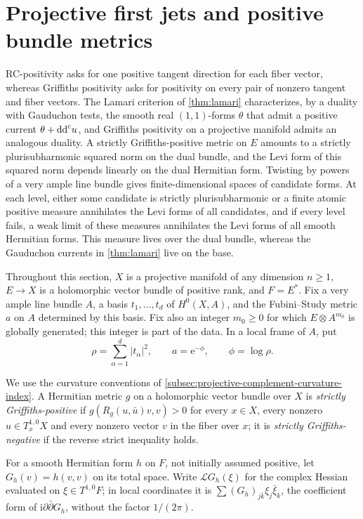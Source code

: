 \section{Projective first jets and positive bundle metrics}
\label{sec:projective-first-jet-positivity}

RC-positivity asks for one positive tangent direction for each fiber vector, whereas Griffiths positivity asks for positivity on every pair of nonzero tangent and fiber vectors. The Lamari criterion of \cref{thm:lamari} characterizes, by a duality with Gauduchon tests, the smooth real $(1,1)$-forms $\theta$ that admit a positive current $\theta+\mathrm{dd}^{\mathrm{c}} u$, and Griffiths positivity on a projective manifold admits an analogous duality. A strictly Griffiths-positive metric on $E$ amounts to a strictly plurisubharmonic squared norm on the dual bundle, and the Levi form of this squared norm depends linearly on the dual Hermitian form. Twisting by powers of a very ample line bundle gives finite-dimensional spaces of candidate forms. At each level, either some candidate is strictly plurisubharmonic or a finite atomic positive measure annihilates the Levi forms of all candidates, and if every level fails, a weak limit of these measures annihilates the Levi forms of all smooth Hermitian forms. This measure lives over the dual bundle, whereas the Gauduchon currents in \cref{thm:lamari} live on the base.

Throughout this section, $X$ is a projective manifold of any dimension $n\geq1$, $E\to X$ is a holomorphic vector bundle of positive rank, and $F=E^*$. Fix a very ample line bundle $A$, a basis $t_1,\ldots,t_d$ of $H^0(X,A)$, and the Fubini--Study metric $a$ on $A$ determined by this basis. Fix also an integer $m_0\geq0$ for which $E\otimes A^{m_0}$ is globally generated; this integer is part of the data. In a local frame of $A$, put
\[
 \rho=\sum_{\alpha=1}^d|t_\alpha|^2,
 \qquad a=\mathrm e^{-\phi},\qquad\phi=\log\rho.
\]

We use the curvature conventions of \cref{subsec:projective-complement-curvature-index}. A Hermitian metric $g$ on a holomorphic vector bundle over $X$ is \emph{strictly Griffiths-positive} if $g(R_g(u,\bar u)v,v)>0$ for every $x\in X$, every nonzero $u\in T_x^{1,0}X$ and every nonzero vector $v$ in the fiber over $x$; it is \emph{strictly Griffiths-negative} if the reverse strict inequality holds.

For a smooth Hermitian form $h$ on $F$, not initially assumed positive, let $G_h(v)=h(v,v)$ on its total space. Write $\mathcal L G_h(\xi)$ for the complex Hessian evaluated on $\xi\in T^{1,0}F$; in local coordinates it is $\sum(G_h)_{j\bar k}\xi_j\bar\xi_k$, the coefficient form of $\mathrm i\partial\bar\partial G_h$, without the factor $1/(2\pi)$.

